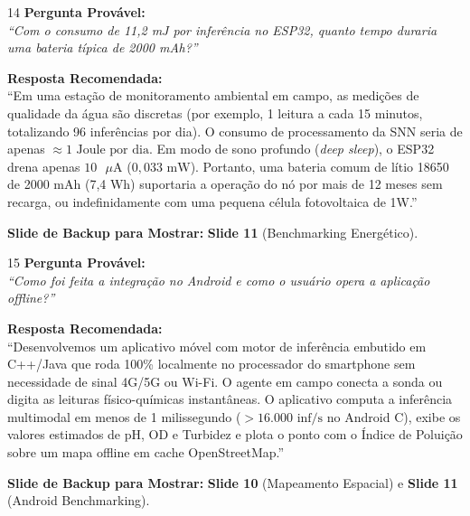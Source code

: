 \documentclass[11pt,a4paper]{article}
\begin{document}
\begin{qnabox}{14}
\textbf{Pergunta Provável:}\\
\textit{``Com o consumo de 11,2 mJ por inferência no ESP32, quanto tempo duraria uma bateria típica de 2000 mAh?''}

\vspace{0.2cm}
\textbf{Resposta Recomendada:}\\
``Em uma estação de monitoramento ambiental em campo, as medições de qualidade da água são discretas (por exemplo, 1 leitura a cada 15 minutos, totalizando 96 inferências por dia). O consumo de processamento da SNN seria de apenas $\approx 1\text{ Joule por dia}$. Em modo de sono profundo (\textit{deep sleep}), o ESP32 drena apenas $10\text{ }\mu\text{A}$ ($0{,}033\text{ mW}$). Portanto, uma bateria comum de lítio 18650 de 2000 mAh (7,4 Wh) suportaria a operação do nó por mais de 12 meses sem recarga, ou indefinidamente com uma pequena célula fotovoltaica de 1W.''

\vspace{0.2cm}
\textbf{Slide de Backup para Mostrar:} \textbf{Slide 11} (Benchmarking Energético).
\end{qnabox}

\begin{qnabox}{15}
\textbf{Pergunta Provável:}\\
\textit{``Como foi feita a integração no Android e como o usuário opera a aplicação offline?''}

\vspace{0.2cm}
\textbf{Resposta Recomendada:}\\
``Desenvolvemos um aplicativo móvel com motor de inferência embutido em C++/Java que roda 100\% localmente no processador do smartphone sem necessidade de sinal 4G/5G ou Wi-Fi. O agente em campo conecta a sonda ou digita as leituras físico-químicas instantâneas. O aplicativo computa a inferência multimodal em menos de 1 milissegundo ($> 16.000\text{ inf/s}$ no Android C), exibe os valores estimados de pH, OD e Turbidez e plota o ponto com o Índice de Poluição sobre um mapa offline em cache OpenStreetMap.''

\vspace{0.2cm}
\textbf{Slide de Backup para Mostrar:} \textbf{Slide 10} (Mapeamento Espacial) e \textbf{Slide 11} (Android Benchmarking).
\end{qnabox}
\end{document}
